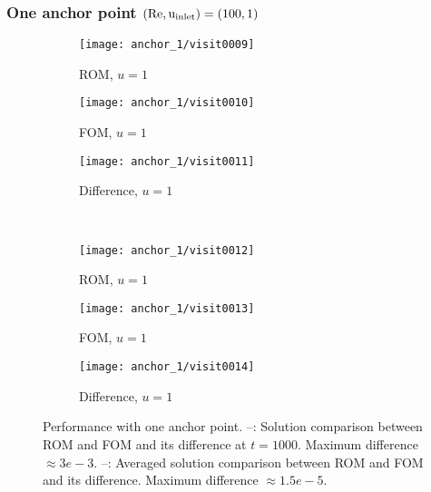 \subsubsection{One anchor point $(\rm Re, u_{inlet}) = (100, 1)$}
\begin{figure}[!h]
     \centering
     \begin{subfigure}[b]{0.3\textwidth}
         \centering
         \texttt{[image: anchor\_1/visit0009]}
         \caption{ROM, $u=1$}
         \label{fig:6_a}
     \end{subfigure}
     \hfill
     \begin{subfigure}[b]{0.3\textwidth}
         \centering
         \texttt{[image: anchor\_1/visit0010]}
         \caption{FOM, $u=1$}
         \label{fig:6_b}
     \end{subfigure}
     \hfill
     \begin{subfigure}[b]{0.3\textwidth}
         \centering
         \texttt{[image: anchor\_1/visit0011]}
         \caption{Difference, $u=1$}
         \label{fig:6_c}
     \end{subfigure}\\
     \begin{subfigure}[b]{0.3\textwidth}
         \centering
         \texttt{[image: anchor\_1/visit0012]}
         \caption{ROM, $u=1$}
         \label{fig:6_d}
     \end{subfigure}
     \hfill
     \begin{subfigure}[b]{0.3\textwidth}
         \centering
         \texttt{[image: anchor\_1/visit0013]}
         \caption{FOM, $u=1$}
         \label{fig:6_e}
     \end{subfigure}
     \hfill
     \begin{subfigure}[b]{0.3\textwidth}
         \centering
         \texttt{[image: anchor\_1/visit0014]}
         \caption{Difference, $u=1$}
         \label{fig:6_f}
     \end{subfigure} 
     \caption{Performance with one anchor point.
     --: Solution comparison between ROM and
     FOM and its difference at $t=1000$. Maximum difference $\approx 3e-3$.
     --: Averaged solution comparison between
     ROM and FOM and its difference. Maximum difference $\approx 1.5e-5$.}
      \label{fig:6}
\end{figure}

